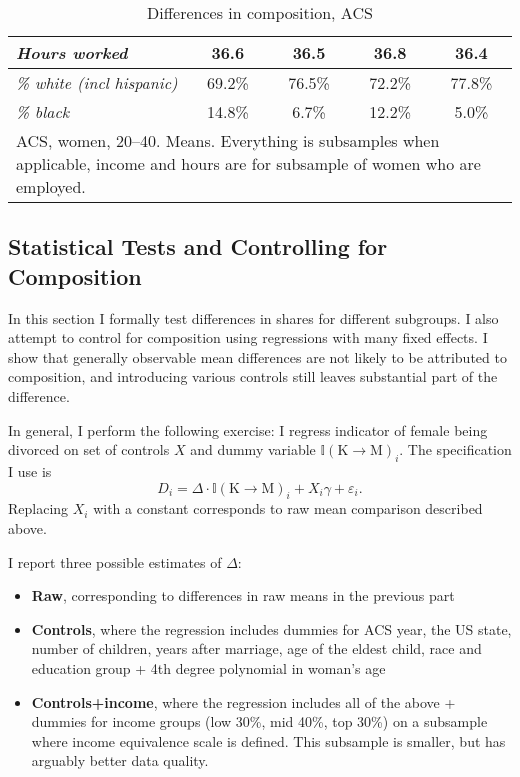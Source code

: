 \documentclass[12pt,letter]{article}
\newcommand{\I}{\mathbb{I}}
\begin{document}
\begin{table}[h!]
\begin{center}
\begin{tabular}{|l|c|c|c|c|}
\textit{Hours worked} & 36.6       &     36.5    &        36.8        &    36.4\\\hline\hline
\textit{\% white (incl hispanic)} & 69.2\%      &      76.5\%      &      72.2\%      &      77.8\% \\
\textit{\% black} & 14.8\% &        6.7\% &            12.2\%       &       5.0\% \\\hline
\multicolumn{5}{|p{0.7\linewidth}|}{\footnotesize ACS, women, 20--40. Means. Everything is subsamples when applicable, income and hours are for subsample of women who are employed.}\\\hline
\end{tabular}
\caption{Differences in composition, ACS\label{diff-comp}}
\end{center}
\end{table}

\subsection{Statistical Tests and Controlling for Composition}

In this section I formally test differences in shares for different subgroups. I also attempt to control for composition using regressions with many fixed effects. I show that generally observable mean differences are not likely to be attributed to composition, and introducing various controls still leaves substantial part of the difference. 

In general, I perform the following exercise: I regress indicator of female being divorced on set of controls $X$ and dummy variable $\I(\text{K$\to$M})_i$. The specification I use is
\[D_i = \Delta \cdot \I(\text{K$\to$M})_i + X_i\gamma + \varepsilon_i.\]
Replacing $X_i$ with a constant corresponds to raw mean comparison described above. 

I report three possible estimates of $\Delta$:
\begin{itemize}
\item \textbf{Raw}, corresponding to differences in raw means in the previous part
\item \textbf{Controls}, where the regression includes dummies for ACS year, the US state, number of children, years after marriage, age of the eldest child, race and education group + 4th degree polynomial in woman's age
\item \textbf{Controls+income}, where the regression includes all of the above + dummies for income groups (low 30\%, mid 40\%, top 30\%) on a subsample where income equivalence scale is defined. This subsample is smaller, but has arguably better data quality.
\end{itemize}
\end{document}

